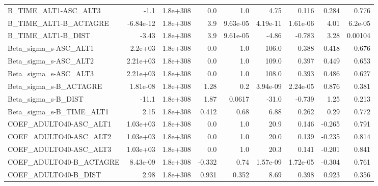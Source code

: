 \begin{tabular}{lrrrrrrrr}
B\_TIME\_ALT1-ASC\_ALT3              &        -1.1 &     1.8e+308 &     0.0 &      1.0 &       4.75 &       0.116 &        0.284 &         0.776 \\
B\_TIME\_ALT1-B\_ACTAGRE             &   -6.84e-12 &     1.8e+308 &     3.9 & 9.63e-05 &   4.19e-11 &    1.61e-06 &         4.01 &       6.2e-05 \\
B\_TIME\_ALT1-B\_DIST                &       -3.43 &     1.8e+308 &     3.9 & 9.61e-05 &      -4.86 &      -0.783 &         3.28 &       0.00104 \\
Beta\_sigma\_s-ASC\_ALT1             &     2.2e+03 &     1.8e+308 &     0.0 &      1.0 &      106.0 &       0.388 &        0.418 &         0.676 \\
Beta\_sigma\_s-ASC\_ALT2             &    2.21e+03 &     1.8e+308 &     0.0 &      1.0 &      109.0 &       0.397 &        0.449 &         0.653 \\
Beta\_sigma\_s-ASC\_ALT3             &    2.21e+03 &     1.8e+308 &     0.0 &      1.0 &      108.0 &       0.393 &        0.486 &         0.627 \\
Beta\_sigma\_s-B\_ACTAGRE            &    1.81e-08 &     1.8e+308 &    1.28 &      0.2 &   3.94e-09 &    2.24e-05 &        0.876 &         0.381 \\
Beta\_sigma\_s-B\_DIST               &       -11.1 &     1.8e+308 &    1.87 &   0.0617 &      -31.0 &      -0.739 &         1.25 &         0.213 \\
Beta\_sigma\_s-B\_TIME\_ALT1          &        2.15 &     1.8e+308 &   0.412 &     0.68 &       6.88 &       0.262 &         0.29 &         0.772 \\
COEF\_ADULTO40-ASC\_ALT1            &    1.03e+03 &     1.8e+308 &     0.0 &      1.0 &       20.9 &       0.146 &       -0.265 &         0.791 \\
COEF\_ADULTO40-ASC\_ALT2            &    1.03e+03 &     1.8e+308 &     0.0 &      1.0 &       20.0 &       0.139 &       -0.235 &         0.814 \\
COEF\_ADULTO40-ASC\_ALT3            &    1.03e+03 &     1.8e+308 &     0.0 &      1.0 &       20.3 &       0.141 &       -0.201 &         0.841 \\
COEF\_ADULTO40-B\_ACTAGRE           &    8.43e-09 &     1.8e+308 &  -0.332 &     0.74 &   1.57e-09 &    1.72e-05 &       -0.304 &         0.761 \\
COEF\_ADULTO40-B\_DIST              &        2.98 &     1.8e+308 &   0.931 &    0.352 &       8.69 &       0.398 &        0.923 &         0.356 \\

\end{tabular}
